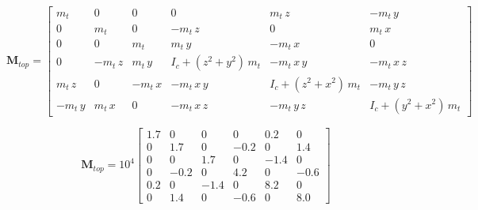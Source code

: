 \documentclass{article}
\begin{document}
\begin{small}
    \begin{equation}
       \mathbf{M}_{top}  = 
        \begin{bmatrix}
         m_{t}  & 0             & 0             & 0                                             & m_{t}\,z                                  & -m_{t}\,y           \\ 
         0             & m_{t}  & 0             & -m_{t}\,z                                 & 0                                             & m_{t}\,x            \\ 
         0             & 0              & m_{t}  & m_{t}\,y                                     & -m_{t}\,x                                    & 0                    \\ 
         0             & -m_{t}\,z & m_{t}\,y     & I_{c}+\left({z}^2+{y   }^2\right)\,m_{t} & -m_{t}\,x   \,y                             & -m_{t}\,x   \,z \\ 
         m_{t}\,z  & 0             & -m_{t}\,x    & -m_{t}\,x   \,y                             & I_{c}+\left({z}^2+{x   }^2\right)\,m_{t} & -m_{t}\,y   \,z \\
         -m_{t}\,y    & m_{t}\,x     & 0             & -m_{t}\,x   \,z                          & -m_{t}\,y   \,z                          & I_{c}+\left({y   }^2+{x   }^2\right)\,m_{t} 
        \end{bmatrix}
        \label{eq:fea:Mtop}
    \end{equation}
\end{small}

 \begin{small}
    \begin{equation}
       \mathbf{M}_{top}  = 10^{4}
        \begin{bmatrix}
1.7 & 0 & 0 & 0 & 0.2 & 0\\
0 & 1.7 & 0 & -0.2 & 0 & 1.4\\
0 & 0 & 1.7 & 0 & -1.4 & 0\\
0 & -0.2 & 0 & 4.2 & 0 & -0.6\\
0.2 & 0 & -1.4 & 0 & 8.2 & 0\\
0 & 1.4 & 0 & -0.6 & 0 & 8.0
        \end{bmatrix}
        \label{eq:fea:Mtop_num}
    \end{equation}
\end{small}
\end{document}
